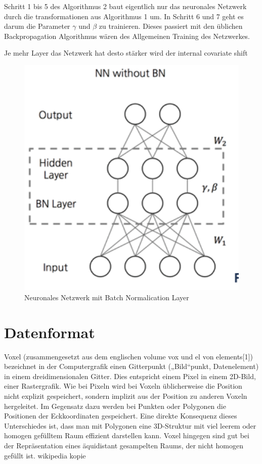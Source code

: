 \documentclass{llncs}
\begin{document}
Schritt 1 bis 5 des Algorithmus 2 baut eigentlich nur das neuronales Netzwerk durch die transformationen aus Algorithmus 1 um. In Schritt 6 und 7 geht es darum die Parameter $\gamma$ und $\beta$ zu trainieren. Dieses passiert mit den üblichen Backpropagation Algorithmus wären des Allgemeinen Training des Netzwerkes. 


Je mehr Layer das Netzwerk hat desto stärker wird der internal covariate shift

\begin{figure}[htbp] 
	\centering
	\includegraphics[width=1.0\textwidth]{batchnorm.png}
	\caption[aaaa]{Neuronales Netzwerk mit Batch Normalication Layer}
	\label{fig:Bild1}
\end{figure}

\section{Datenformat}
Voxel (zusammengesetzt aus dem englischen volume vox und el von elements[1]) bezeichnet in der Computergrafik einen Gitterpunkt („Bild“punkt, Datenelement) in einem dreidimensionalen Gitter. Dies entspricht einem Pixel in einem 2D-Bild, einer Rastergrafik. Wie bei Pixeln wird bei Voxeln üblicherweise die Position nicht explizit gespeichert, sondern implizit aus der Position zu anderen Voxeln hergeleitet. Im Gegensatz dazu werden bei Punkten oder Polygonen die Positionen der Eckkoordinaten gespeichert. Eine direkte Konsequenz dieses Unterschiedes ist, dass man mit Polygonen eine 3D-Struktur mit viel leerem oder homogen gefülltem Raum effizient darstellen kann. Voxel hingegen sind gut bei der Repräsentation eines äquidistant gesampelten Raums, der nicht homogen gefüllt ist. wikipedia kopie
\end{document}
